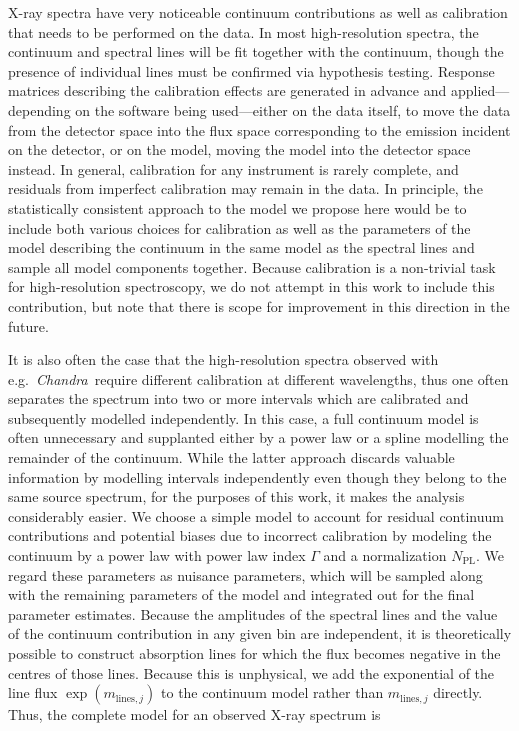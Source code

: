 \documentclass[12pt]{emulateapj}
\newcommand{\project}[1]{\textsl{#1}}
\newcommand{\chandra}{\project{Chandra}}
\newcommand{\mean}{m}
\begin{document}
X-ray spectra have very noticeable continuum contributions as well as calibration that needs to be performed on the data. In most high-resolution spectra, the continuum and spectral lines will be fit together with the continuum, though the presence of individual lines must be confirmed via hypothesis testing. Response matrices describing the calibration effects are generated in advance and applied---depending on the software being used---either on the data itself, to move the data from the detector space into the flux space corresponding to the emission incident on the detector, or on the model, moving the model into the detector space instead. In general, calibration for any instrument is rarely complete, and residuals from imperfect calibration may remain in the data. 
In principle, the statistically consistent approach to the model we propose here would be to include both various choices for calibration as well as the parameters of the model describing the continuum in the same model as the spectral lines and sample all model components together. Because calibration is a non-trivial task for high-resolution spectroscopy, we do not attempt in this work to include this contribution, but note that there is scope for improvement in this direction in the future. 

It is also often the case that the high-resolution spectra observed with e.g.\ \chandra\ require different calibration at different wavelengths, thus one often separates the spectrum into two or more intervals which are calibrated and subsequently modelled independently. In this case, a full continuum model is often unnecessary and supplanted either by a power law or a spline modelling the remainder of the continuum. While the latter approach discards valuable information by modelling intervals independently even though they belong to the same source spectrum, for the purposes of this work, it makes the analysis considerably easier.
We choose a simple model to account for residual continuum contributions and potential biases due to incorrect calibration by modeling the continuum by a power law with power law index $\Gamma$ and a normalization $N_{\mathrm{PL}}$. %
We regard these parameters as nuisance parameters, which will be sampled along with the remaining parameters of the model and integrated out for the final parameter estimates. 
Because the amplitudes of the spectral lines and the value of the continuum contribution in any given bin are independent, it is theoretically possible to construct absorption lines for which the flux becomes negative in the centres of those lines. Because this is unphysical, we add the exponential of the line flux $\exp{(\mean_{\mathrm{lines},j})}$ to the continuum model rather than $\mean_{\mathrm{lines},j}$ directly.
Thus, the complete model for an observed X-ray spectrum is
\end{document}
